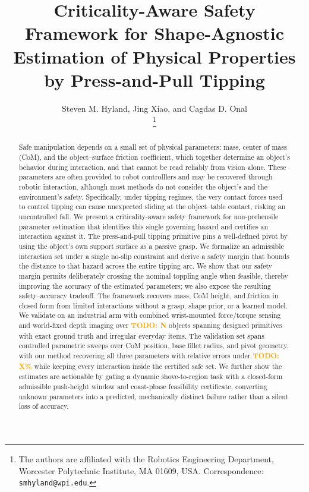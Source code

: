 \documentclass[10pt, conference]{IEEEtran}
\title{\LARGE \bf Criticality-Aware Safety Framework for Shape-Agnostic Estimation of Physical Properties by Press-and-Pull Tipping}
\newcommand{\todo}[1]{\textcolor{orange}{\textbf{TODO: #1}}}
\begin{document}
\author{ Steven M. Hyland, Jing Xiao, and Cagdas D. Onal \\ \thanks{The authors are affiliated with the Robotics Engineering Department, Worcester Polytechnic Institute, MA 01609, USA. Correspondence: \texttt{smhyland@wpi.edu}.} }

\maketitle

\begin{abstract}
Safe manipulation depends on a small set of physical parameters: mass, center of mass (CoM), and the object--surface friction coefficient, which together determine an object's behavior during interaction, and that cannot be read reliably from vision alone. These parameters are often provided to robot controlllers and may be recovered through robotic interaction, although most methods do not consider the object's and the environment's safety. Specifically, under tipping regimes, the very contact forces used to control tipping can cause unexpected sliding at the object--table contact, risking an uncontrolled fall. We present a criticality-aware safety framework for non-prehensile parameter estimation that identifies this single governing hazard and certifies an interaction against it. The press-and-pull tipping primitive pins a well-defined pivot by using the object's own support surface as a passive grasp. We formalize an admissible interaction set under a single no-slip constraint and derive a safety margin that bounds the distance to that hazard across the entire tipping arc. We show that our safety margin permits deliberately crossing the nominal toppling angle when feasible, thereby improving the accuracy of the estimated parameters; we also expose the resulting safety--accuracy tradeoff. The framework recovers mass, CoM height, and friction in closed form from limited interactions without a grasp, shape prior, or a learned model. We validate on an industrial arm with combined wrist-mounted force/torque sensing and world-fixed depth imaging over \todo{N} objects spanning designed primitives with exact ground truth and irregular everyday items. The validation set spans controlled parametric sweeps over CoM position, base fillet radius, and pivot geometry, with our method recovering all three parameters with relative errors under \todo{X\%} while keeping every interaction inside the certified safe set. We further show the estimates are actionable by gating a dynamic shove-to-region task with a closed-form admissible push-height window and coast-phase feasibility certificate, converting unknown parameters into a predicted, mechanically distinct failure rather than a silent loss of accuracy.
\end{abstract}
\end{document}
